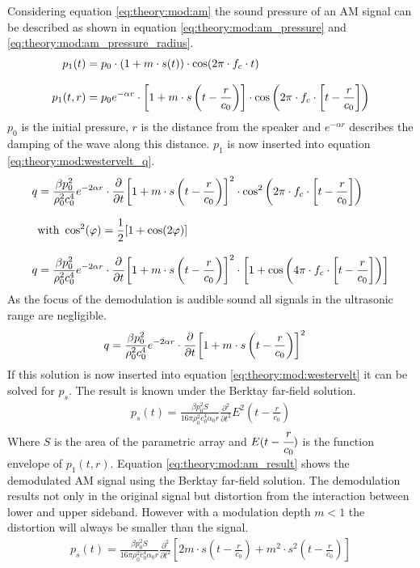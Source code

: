Considering equation \ref{eq:theory:mod:am} the sound pressure of an AM signal can be described as shown in equation \ref{eq:theory:mod:am_pressure} and \ref{eq:theory:mod:am_pressure_radius}.
%
\begin{align}
  p_1(t) &= p_0 \cdot (1 + m \cdot s(t)) \cdot \cos (2 \pi \cdot f_c \cdot t)\label{eq:theory:mod:am_pressure}\pmath
  p_1(t, r) &= p_0 e^{- \alpha r} \cdot \left[1 + m \cdot s\left(t - \frac{r}{c_0}\right)\right] \cdot \cos \left(2 \pi \cdot f_c \cdot \left[t - \frac{r}{c_0}\right]\right)\label{eq:theory:mod:am_pressure_radius}
\end{align}
%
$p_0$ is the initial pressure, $r$ is the distance from the speaker and $e^{- \alpha r}$ describes the damping of the wave along this distance.\p
$p_1$ is now inserted into equation \ref{eq:theory:mod:westervelt_q}.
%
\begin{align}
  q &= \frac{\beta p_0^2}{\rho_0^2 c_0^4} e^{ - 2 \alpha r} \cdot \cfrac{\partial }{\partial t} \left[1 + m \cdot s\left(t - \frac{r}{c_0}\right)\right]^2 \cdot \cos^2 \left(2 \pi \cdot f_c \cdot \left[t - \frac{r}{c_0}\right]\right)\pmath
  &\mathrm{with~} \cos^2(\varphi) = \frac{1}{2} [1 + \cos (2 \varphi)]\pmath
  q &= \frac{\beta p_0^2}{\rho_0^2 c_0^4} e^{ - 2 \alpha r} \cdot \cfrac{\partial }{\partial t} \left[1 + m \cdot s\left(t - \frac{r}{c_0}\right)\right]^2 \cdot \left[1 + \cos \left(4 \pi \cdot f_c \cdot \left[t - \frac{r}{c_0}\right]\right)\right]
\end{align}
%
As the focus of the demodulation is audible sound all signals in the ultrasonic range are negligible.
%
\begin{align}
  q &= \frac{\beta p_0^2}{\rho_0^2 c_0^4} e^{ - 2 \alpha r} \cdot \cfrac{\partial }{\partial t} \left[1 + m \cdot s\left(t - \frac{r}{c_0}\right)\right]^2
\end{align}
%
If this solution is now inserted into equation \ref{eq:theory:mod:westervelt} it can be solved for $p_s$. The result is known under the Berktay far-field solution\cite{bai_analysis_2012}.
%
\begin{align}
  p_s(t) = \frac{\beta p_0^2 S}{16 \pi \rho_0^2 c_0^4 \alpha_0 r} \frac{\partial^2}{\partial t^2} E^2(t - \frac{r}{c_0})\label{eq:theory:mod:berktay}
\end{align}
%
Where $S$ is the area of the parametric array and $E(t - \cfrac{r}{c_0})$ is the function envelope of $p_1(t,r)$.\p
Equation \ref{eq:theory:mod:am_result} shows the demodulated AM signal using the Berktay far-field solution. The demodulation results not only in the original signal but distortion from the interaction between lower and upper sideband. However with a modulation depth $m < 1$ the distortion will always be smaller than the signal.
%
\begin{align}
  p_s(t) = \frac{\beta p_0^2 S}{16 \pi \rho_0^2 c_0^4 \alpha_0 r} \frac{\partial^2}{\partial t^2} \left[ 2 m \cdot s\left(t - \frac{r}{c_0}\right) + m^2 \cdot s^2\left(t - \frac{r}{c_0}\right)\right]\label{eq:theory:mod:am_result}
\end{align}
%

